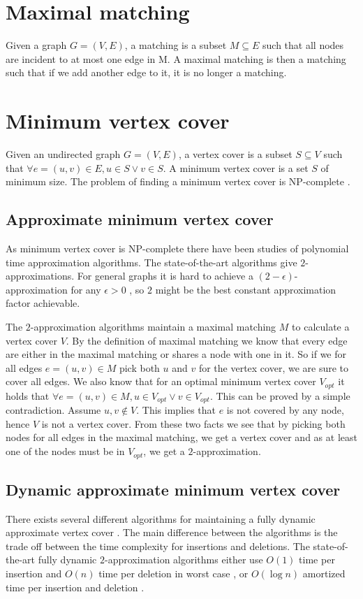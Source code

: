 \section{Maximal matching}
Given a graph $G = (V,E)$, a matching is a subset $M \subseteq E$ such that all nodes are incident to at most one edge in M. A maximal matching is then a matching such that if we add another edge to it, it is no longer a matching. 


\section{Minimum vertex cover}
Given an undirected graph $G = (V,E)$, a vertex cover is a subset $S \subseteq V$ such that $\forall e = (u,v) \in E,  u \in S \vee v \in S$. A minimum vertex cover is a set $S$ of minimum size. The problem of finding a minimum vertex cover is NP-complete \cite{Kar72}.

\subsection{Approximate minimum vertex cover}
As minimum vertex cover is NP-complete there have been studies of polynomial time approximation algorithms. The state-of-the-art algorithms give $2$-approximations. For general graphs it is hard to achieve a $(2-\epsilon)$-approximation for any $\epsilon > 0$ \cite{2-evchard}, so $2$ might be the best constant approximation factor achievable.

The $2$-approximation algorithms maintain a maximal matching $M$ to calculate a vertex cover $V$. By the definition of maximal matching we know that every edge are either in the maximal matching or shares a node with one in it. So if we for all edges $e = (u,v) \in M$ pick both $u$ and $v$ for the vertex cover, we are sure to cover all edges. We also know that for an optimal minimum vertex cover $V_{opt}$ it holds that $\forall e = (u,v) \in M, u \in V_{opt} \vee v \in V_{opt}$. This can be proved by a simple contradiction. Assume $u,v \notin V$. This implies that $e$ is not covered by any node, hence $V$ is not a vertex cover. From these two facts we see that by picking both nodes for all edges in the maximal matching, we get a vertex cover and as at least one of the nodes must be in $V_{opt}$, we get a $2$-approximation. 

\subsection{Dynamic approximate minimum vertex cover}
There exists several different algorithms for maintaining a fully dynamic approximate vertex cover \cite{2appdynvc, 2appdynvclogn, 2eappdynvc}. The main difference between the algorithms is the trade off between the time complexity for insertions and deletions. The state-of-the-art fully dynamic $2$-approximation algorithms either use $O(1)$ time per insertion and $O(n)$ time per deletion in worst case \cite{2appdynvc}, or $O(\log n)$ amortized time per insertion and deletion \cite{2appdynvclogn}. 


